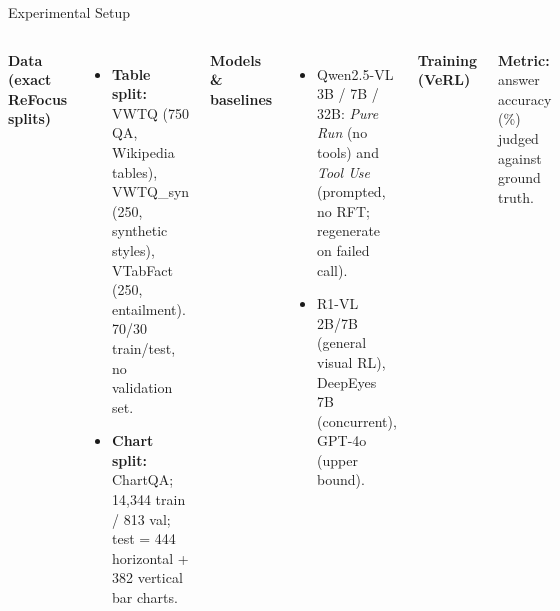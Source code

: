 \documentclass[aspectratio=169]{beamer}
\begin{document}
\begin{frame}{Experimental Setup}
  \begin{columns}[T]
    \textbf{\textcolor{deepgold}{Data (exact ReFocus splits)}}
    \begin{itemize}\small
      \item \textbf{Table split:} VWTQ (750 QA, Wikipedia tables), VWTQ\_syn (250, synthetic styles),
            VTabFact (250, entailment). 70/30 train/test, no validation set.
      \item \textbf{Chart split:} ChartQA; 14,344 train / 813 val; test = 444 horizontal + 382 vertical bar charts.
    \end{itemize}
    \textbf{\textcolor{deepgold}{Models \& baselines}}
    \begin{itemize}\small
      \item Qwen2.5-VL 3B / 7B / 32B: \emph{Pure Run} (no tools) and \emph{Tool Use} (prompted, no RFT;
            regenerate on failed call).
      \item R1-VL 2B/7B (general visual RL), DeepEyes 7B (concurrent), GPT-4o (upper bound).
    \end{itemize}
    \textbf{\textcolor{deepgold}{Training (VeRL)}}
    \vspace{0.1cm}

    \vspace{0.3cm}

    \small \textbf{Metric:} answer accuracy (\%) judged against ground truth.
  \end{columns}
\end{frame}
\end{document}
